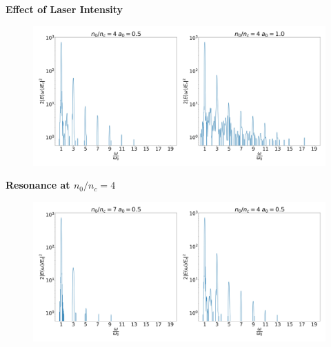 \documentclass{beamer}
\begin{document}
\begin{frame}
    \small
    \textbf{Effect of Laser Intensity}
    \begin{figure}
        \centering
        \includegraphics[width=1.0\textwidth, height=0.40\textheight]{images/intensity.jpg}
        \label{fig:LaserIntensity}
    \end{figure}
    \textbf{Resonance at $n_0/n_c = 4$}
    \begin{figure}
        \centering
        \includegraphics[width=1.0\textwidth, height=0.40\textheight]{images/density.jpg}
        \label{fig:PlasmaDensity}
    \end{figure}
\end{frame}
\end{document}
